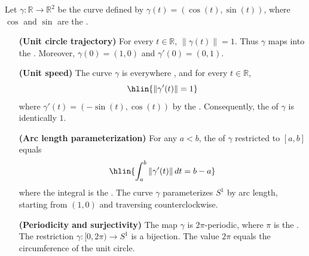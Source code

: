 \begin{proposition} \label{proposition:sine_and_cosine_parameterize_the_unit_circle_by_arc_length}
Let $\gamma : \mathbb{R} \to \mathbb{R}^2$ be the curve defined by $\gamma(t) = (\cos(t), \sin(t))$, where $\cos$ and $\sin$ are the .

\begin{enumerate}
    \item[\textbf{(Unit circle trajectory)}] For every $t \in \mathbb{R}$, $\|\gamma(t)\| = 1$. Thus $\gamma$ maps into the . Moreover, $\gamma(0) = (1, 0)$ and $\gamma'(0) = (0, 1)$.

    \item[\textbf{(Unit speed)}] The curve $\gamma$ is everywhere , and for every $t \in \mathbb{R}$,
    $$\hlin{\|\gamma'(t)\| = 1}$$
    where $\gamma'(t) = (-\sin(t), \cos(t))$ by the . Consequently, the  of $\gamma$ is identically $1$.

    \item[\textbf{(Arc length parameterization)}] For any $a < b$, the  of $\gamma$ restricted to $[a, b]$ equals
    $$\hlin{\int_a^b \|\gamma'(t)\| \, dt = b - a}$$
    where the integral is the . The curve $\gamma$ parameterizes $S^1$ by arc length, starting from $(1, 0)$ and traversing counterclockwise.

    \item[\textbf{(Periodicity and surjectivity)}] The map $\gamma$ is $2\pi$-periodic, where $\pi$ is the . The restriction $\gamma : [0, 2\pi) \to S^1$ is a bijection. The value $2\pi$ equals the circumference of the unit circle.
\end{enumerate}
\end{proposition}
